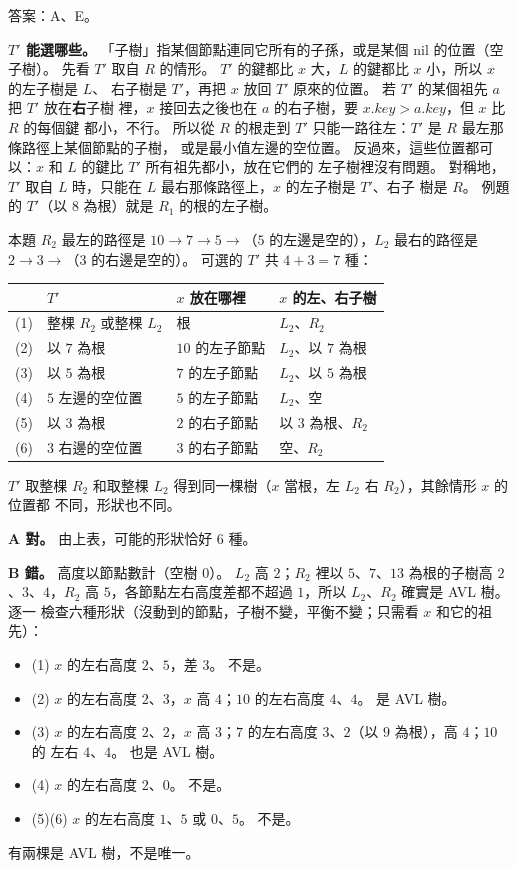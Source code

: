\begin{pastsoln}
答案：A、E。

\textbf{$T'$ 能選哪些。} 「子樹」指某個節點連同它所有的子孫，或是某個 nil 的位置（空子樹）。
先看 $T'$ 取自 $R$ 的情形。 $T'$ 的鍵都比 $x$ 大，$L$ 的鍵都比 $x$ 小，所以 $x$ 的左子樹是 $L$、
右子樹是 $T'$，再把 $x$ 放回 $T'$ 原來的位置。 若 $T'$ 的某個祖先 $a$ 把 $T'$ 放在\textbf{右}子樹
裡，$x$ 接回去之後也在 $a$ 的右子樹，要 $x.\mathit{key} > a.\mathit{key}$，但 $x$ 比 $R$ 的每個鍵
都小，不行。 所以從 $R$ 的根走到 $T'$ 只能一路往左：$T'$ 是 $R$ 最左那條路徑上某個節點的子樹，
或是最小值左邊的空位置。 反過來，這些位置都可以：$x$ 和 $L$ 的鍵比 $T'$ 所有祖先都小，放在它們的
左子樹裡沒有問題。 對稱地，$T'$ 取自 $L$ 時，只能在 $L$ 最右那條路徑上，$x$ 的左子樹是 $T'$、右子
樹是 $R$。 例題的 $T'$（以 $8$ 為根）就是 $R_1$ 的根的左子樹。

本題 $R_2$ 最左的路徑是 $10 \to 7 \to 5 \to$（$5$ 的左邊是空的），$L_2$ 最右的路徑是
$2 \to 3 \to$（$3$ 的右邊是空的）。 可選的 $T'$ 共 $4 + 3 = 7$ 種：
\begin{center}
\begin{tabular}{clll}
\toprule
 & $T'$ & $x$ 放在哪裡 & $x$ 的左、右子樹 \\
\midrule
(1) & 整棵 $R_2$ 或整棵 $L_2$ & 根 & $L_2$、$R_2$ \\
(2) & 以 $7$ 為根 & $10$ 的左子節點 & $L_2$、以 $7$ 為根 \\
(3) & 以 $5$ 為根 & $7$ 的左子節點 & $L_2$、以 $5$ 為根 \\
(4) & $5$ 左邊的空位置 & $5$ 的左子節點 & $L_2$、空 \\
(5) & 以 $3$ 為根 & $2$ 的右子節點 & 以 $3$ 為根、$R_2$ \\
(6) & $3$ 右邊的空位置 & $3$ 的右子節點 & 空、$R_2$ \\
\bottomrule
\end{tabular}
\end{center}
$T'$ 取整棵 $R_2$ 和取整棵 $L_2$ 得到同一棵樹（$x$ 當根，左 $L_2$ 右 $R_2$），其餘情形 $x$ 的位置都
不同，形狀也不同。

\textbf{A 對。} 由上表，可能的形狀恰好 $6$ 種。

\textbf{B 錯。} 高度以節點數計（空樹 $0$）。 $L_2$ 高 $2$；$R_2$ 裡以 $5$、$7$、$13$ 為根的子樹高
$2$、$3$、$4$，$R_2$ 高 $5$，各節點左右高度差都不超過 $1$，所以 $L_2$、$R_2$ 確實是 AVL 樹。 逐一
檢查六種形狀（沒動到的節點，子樹不變，平衡不變；只需看 $x$ 和它的祖先）：
\begin{itemize}
\item (1) $x$ 的左右高度 $2$、$5$，差 $3$。 不是。
\item (2) $x$ 的左右高度 $2$、$3$，$x$ 高 $4$；$10$ 的左右高度 $4$、$4$。 是 AVL 樹。
\item (3) $x$ 的左右高度 $2$、$2$，$x$ 高 $3$；$7$ 的左右高度 $3$、$2$（以 $9$ 為根），高 $4$；$10$ 的
左右 $4$、$4$。 也是 AVL 樹。
\item (4) $x$ 的左右高度 $2$、$0$。 不是。
\item (5)(6) $x$ 的左右高度 $1$、$5$ 或 $0$、$5$。 不是。
\end{itemize}
有兩棵是 AVL 樹，不是唯一。


\end{pastsoln}
